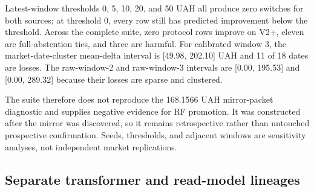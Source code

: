 \begin{table}[t]
\centering
\caption{Post-defense RF temporal suite at the frozen 20 UAH threshold. Positive delta means higher regret than V2+. Switch and tail-loss counts use primary seed 42; the range covers seeds 42, 2026, and 7.}
\label{tab:05:results:7}
\small
{}
\end{table}

Latest-window thresholds 0, 5, 10, 20, and 50 UAH all produce zero switches for both sources; at threshold 0, every row still has predicted improvement below the threshold. Across the complete suite, zero protocol rows improve on V2+, eleven are full-abstention ties, and three are harmful. For calibrated window 3, the market-date-cluster mean-delta interval is [49.98, 202.10] UAH and 11 of 18 dates are losses. The raw-window-2 and raw-window-3 intervals are [0.00, 195.53] and [0.00, 289.32] because their losses are sparse and clustered.

The suite therefore does not reproduce the 168.1566 UAH mirror-packet diagnostic and supplies negative evidence for RF promotion. It was constructed after the mirror was discovered, so it remains retrospective rather than untouched prospective confirmation. Seeds, thresholds, and adjacent windows are sensitivity analyses, not independent market replications.

\subsection{Separate transformer and read-model lineages}

